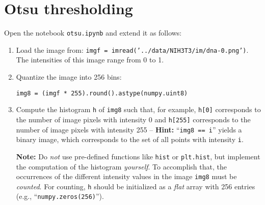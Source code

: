 \documentclass[12pt,a4paper]{article}
\begin{document}
\section{Otsu thresholding}
\label{task:otsu}

Open the notebook \texttt{otsu.ipynb} and extend it as follows:

\begin{enumerate}
    \item Load the image from: \texttt{imgf = imread('../data/NIH3T3/im/dna-0.png')}.\\ The intensities of this image range from 0 to 1.
    \item Quantize the image into 256 bins:
\begin{Verbatim}[frame=single]
img8 = (imgf * 255).round().astype(numpy.uint8)
\end{Verbatim}
    \item Compute the histogram \texttt{h} of \texttt{img8} such that, for example, \texttt{h[0]} corresponds to the number of image pixels with intensity 0 and \texttt{h[255]} corresponds to the number of image pixels with intensity 255 -- \textbf{Hint:} ``\texttt{img8 == i}'' yields a binary image, which corresponds to the set of all points with intensity \texttt{i}.
    
    \textbf{Note:} Do \emph{not} use pre-defined functions like \texttt{hist} or \texttt{plt.hist}, but implement the computation of the histogram \emph{yourself}. To accomplish that, the occurrences of the different intensity values in the image \texttt{img8} must be \emph{counted}. For counting, \texttt{h} should be initialized as a \emph{flat} array with 256 entries (e.g., ``\texttt{numpy.zeros(256)}'').
    

\end{enumerate}
\end{document}
